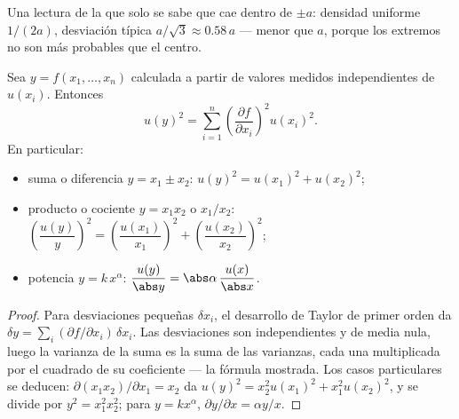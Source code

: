 \begin{omfigure}

{\small Una lectura de la que solo se sabe que cae dentro de $\pm a$:
densidad uniforme $1/(2a)$, desviación típica $a/\sqrt3 \approx 0.58\,a$
--- menor que $a$, porque los extremos no son más probables que el centro.}
\end{omfigure}

\begin{theorem}\label{thm:b1:units-dimensions:propagation}
Sea $y = f(x_1, \dots, x_n)$ calculada a partir de valores medidos
independientes de  $u(x_i)$. Entonces
\[
u(y)^2 = \sum_{i=1}^n \left(\frac{\partial f}{\partial x_i}\right)^2 u(x_i)^2 .
\]
En particular:
\begin{itemize}
  \item suma o diferencia $y = x_1 \pm x_2$:
        $u(y)^2 = u(x_1)^2 + u(x_2)^2$;
  \item producto o cociente $y = x_1 x_2$ o $x_1/x_2$:
        $\left(\dfrac{u(y)}{y}\right)^2 = \left(\dfrac{u(x_1)}{x_1}\right)^2
        + \left(\dfrac{u(x_2)}{x_2}\right)^2$;
  \item potencia $y = k\,x^\alpha$: $\dfrac{u(y)}{\abs y} = \abs\alpha\,\dfrac{u(x)}{\abs x}$.
\end{itemize}
\end{theorem}

\begin{proof}
Para desviaciones pequeñas $\delta x_i$, el desarrollo de Taylor de primer
orden da $\delta y = \sum_i (\partial f/\partial x_i)\,\delta x_i$. Las
desviaciones son independientes y de media nula, luego la varianza de la
suma es la suma de las varianzas, cada una multiplicada por el cuadrado de
su coeficiente --- la fórmula mostrada. Los casos particulares se deducen:
$\partial(x_1 x_2)/\partial x_1 = x_2$ da
$u(y)^2 = x_2^2 u(x_1)^2 + x_1^2 u(x_2)^2$, y se divide por $y^2 = x_1^2 x_2^2$;
para $y = kx^\alpha$, $\partial y/\partial x = \alpha y/x$.
\end{proof}

